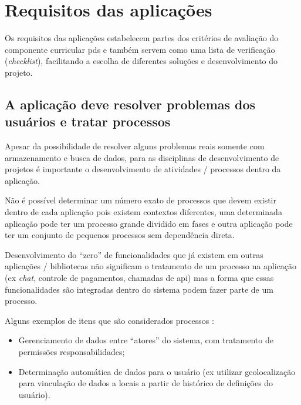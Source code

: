 \chapter{Requisitos das aplicações}
\label{requisitos-aplicacoes}

Os requisitos das aplicações estabelecem partes dos critérios de avaliação do componente curricular \ac{pds} e também servem como uma lista de verificação (\emph{checklist}), facilitando a escolha de diferentes soluções e desenvolvimento do projeto.


\section{A aplicação deve resolver problemas dos usuários e tratar processos}

Apesar da possibilidade de resolver alguns problemas reais somente com armazenamento e busca de dados, para as disciplinas de desenvolvimento de projetos é importante o desenvolvimento de atividades / processos dentro da aplicação.

Não é possível determinar um número exato de processos que devem existir dentro de cada aplicação pois existem contextos diferentes, uma determinada aplicação pode ter um processo grande dividido em fases e outra aplicação pode ter um conjunto de pequenos processos sem dependência direta.

Desenvolvimento do \enquote{zero} de funcionalidades que já existem em outras aplicações / bibliotecas não significam o tratamento de um processo na aplicação (ex \emph{chat}, controle de pagamentos, chamadas de \ac{api}) mas a forma que essas funcionalidades são integradas dentro do sistema podem fazer parte de um processo.

Alguns exemplos de itens que são considerados processos :


\begin{itemize}
    \item Gerenciamento de dados entre \enquote{atores} do sistema, com tratamento de permissões responsabilidades;
    
    
    \item Determinação automática de dados para o usuário (ex utilizar geolocalização para vinculação de dados a locais a partir de histórico de definições do usuário).
\end{itemize}


